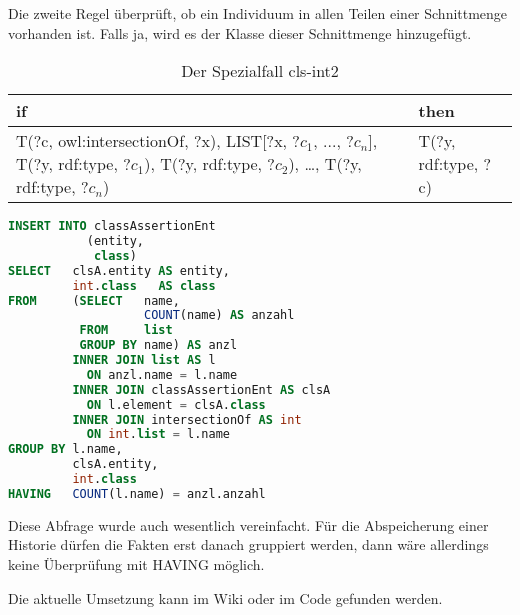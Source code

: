 Die zweite Regel überprüft, ob ein Individuum in allen Teilen einer Schnittmenge vorhanden ist. Falls ja, wird es der Klasse dieser Schnittmenge hinzugefügt.
\begin{table}[htb]
\begin{center}
	\begin{tabular}{m{5cm}|m{3.5cm}}
	if & then \\ \hline
	T(?c, owl:intersectionOf, ?x),\newline
	LIST[?x, ?$c_1$, ..., ?$c_n$],\newline
	T(?y, rdf:type, ?$c_1$),\newline
	T(?y, rdf:type, ?$c_2$),\newline
	\ldots,\newline
	T(?y, rdf:type, ?$c_n$) & T(?y, rdf:type, ?c) 	 
	\end{tabular}
\end{center}
	\caption{Der Spezialfall cls-int2}
	\label{rule-cls-int2}
\end{table}


\begin{lstlisting}[language=SQL]
INSERT INTO classAssertionEnt
           (entity,
            class)
SELECT   clsA.entity AS entity,
         int.class   AS class
FROM     (SELECT   name,
                   COUNT(name) AS anzahl
          FROM     list
          GROUP BY name) AS anzl
         INNER JOIN list AS l
           ON anzl.name = l.name
         INNER JOIN classAssertionEnt AS clsA
           ON l.element = clsA.class
         INNER JOIN intersectionOf AS int
           ON int.list = l.name
GROUP BY l.name,
         clsA.entity,
         int.class
HAVING   COUNT(l.name) = anzl.anzahl
\end{lstlisting}

Diese Abfrage wurde auch wesentlich vereinfacht. Für die Abspeicherung einer Historie dürfen die Fakten erst danach gruppiert werden, dann wäre allerdings keine Überprüfung mit HAVING möglich.

Die aktuelle Umsetzung kann im Wiki oder im Code gefunden werden.

